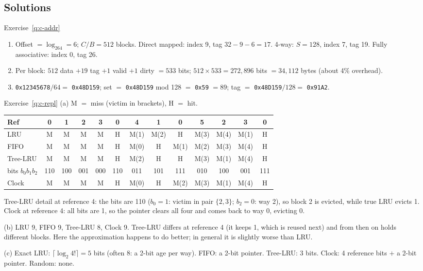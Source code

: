 \subsection{Solutions}
\label{sec:cache-sol}

\begin{noot}{Exercise~\ref{q:c-addr}}
\begin{enumerate}[label=(\alph*),leftmargin=*]
  \item Offset $=\log_264=6$; $C/B=512$ blocks.
  Direct mapped: index 9, tag $32-9-6=17$.
  4-way: $S=128$, index 7, tag 19.
  Fully associative: index 0, tag 26.
  \item Per block: $512$ data $+19$ tag $+1$ valid $+1$ dirty $=533$ bits;
  $512\times533=272{,}896$ bits $=34{,}112$ bytes (about 4\% overhead).
  \item \texttt{0x12345678}$/64=$ \texttt{0x48D159}; set $=$ \texttt{0x48D159} mod
  128 $=$ \texttt{0x59} $=89$; tag $=$ \texttt{0x48D159}$/128=$ \texttt{0x91A2}.
\end{enumerate}
\end{noot}

\begin{noot}{Exercise~\ref{q:c-repl}}
(a) M $=$ miss (victim in brackets), H $=$ hit.
\begin{center}
\small
\setlength{\tabcolsep}{3pt}
\begin{tabular}{@{}lcccccccccccc@{}}
\toprule
Ref & 0 & 1 & 2 & 3 & 0 & 4 & 1 & 0 & 5 & 2 & 3 & 0 \\
\midrule
LRU & M & M & M & M & H & M(1) & M(2) & H & M(3) & M(4) & M(1) & H \\
FIFO & M & M & M & M & H & M(0) & H & M(1) & M(2) & M(3) & M(4) & H \\
Tree-LRU & M & M & M & M & H & M(2) & H & H & M(3) & M(1) & M(4) & H \\
\quad bits $b_0b_1b_2$ & 110 & 100 & 001 & 000 & 110 & 011 & 101 & 111 & 010 & 100 & 001 & 111 \\
Clock & M & M & M & M & H & M(0) & H & M(2) & M(3) & M(1) & M(4) & H \\
\bottomrule
\end{tabular}
\end{center}
Tree-LRU detail at reference 4: the bits are 110 ($b_0=1$: victim in pair
$\{2,3\}$; $b_2=0$: way 2), so block 2 is evicted, while true LRU evicts 1. Clock at
reference 4: all bits are 1, so the pointer clears all four and comes back to way 0,
evicting 0.

(b) LRU 9, FIFO 9, Tree-LRU 8, Clock 9. Tree-LRU differs at reference 4 (it keeps 1,
which is reused next) and from then on holds different blocks. Here the
approximation happens to do better; in general it is slightly worse than LRU.

(c) Exact LRU: $\lceil\log_2 4!\rceil=5$ bits (often 8: a 2-bit age per way).
FIFO: a 2-bit pointer. Tree-LRU: 3 bits. Clock: 4 reference bits $+$ a 2-bit
pointer. Random: none.
\end{noot}

